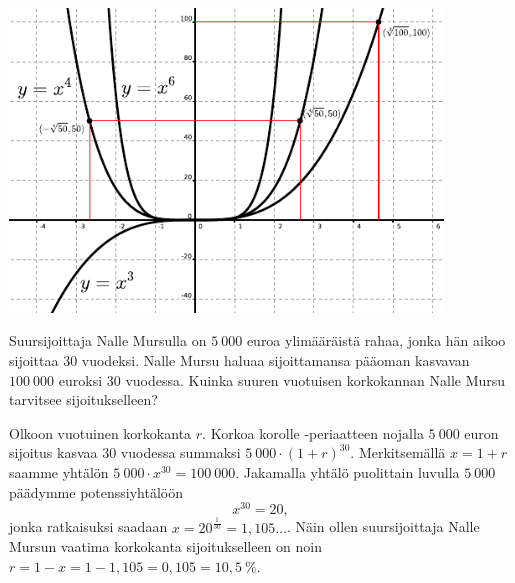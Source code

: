 \begin{esimerkki}
	\begin{alakohdat}
	\end{alakohdat}
	\begin{center}
		\includegraphics[width=11.5cm]{pictures/xpot346.pdf} %
	\end{center}
\end{esimerkki}


\begin{esimerkki}
	Suursijoittaja Nalle Mursulla on $5~000$ euroa ylimääräistä rahaa, jonka hän aikoo sijoittaa $30$ vuodeksi.  Nalle Mursu haluaa sijoittamansa pääoman kasvavan $100~000$ euroksi $30$ vuodessa.  Kuinka suuren vuotuisen korkokannan Nalle Mursu tarvitsee sijoitukselleen? 
	\begin{esimratk}
		Olkoon vuotuinen korkokanta $r$. Korkoa korolle -periaatteen nojalla $5~000$ euron sijoitus
		kasvaa $30$ vuodessa summaksi $5~000\cdot(1+r)^{30}$. Merkitsemällä $x=1+r$ saamme yhtälön $5~000\cdot x^{30} = 100~000$.
		Jakamalla yhtälö puolittain luvulla $5~000$ päädymme potenssiyhtälöön
		\[ x^{30} = 20, \] 
		jonka ratkaisuksi saadaan $x=20^{\frac{1}{30}} = 1{,}105\ldots$. Näin
		ollen suursijoittaja Nalle Mursun vaatima korkokanta sijoitukselleen on noin $r=1-x=1-1,105=0,105=10{,}5~\%$.
	\end{esimratk}
\end{esimerkki}


